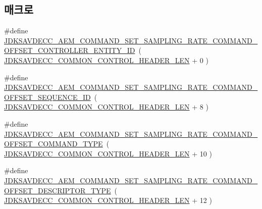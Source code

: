 \subsection*{매크로}
\begin{DoxyCompactItemize}
\item 
\#define \hyperlink{group__command__set__sampling__rate_gac21e08aedf5431e401f87a4b1363950b}{J\+D\+K\+S\+A\+V\+D\+E\+C\+C\+\_\+\+A\+E\+M\+\_\+\+C\+O\+M\+M\+A\+N\+D\+\_\+\+S\+E\+T\+\_\+\+S\+A\+M\+P\+L\+I\+N\+G\+\_\+\+R\+A\+T\+E\+\_\+\+C\+O\+M\+M\+A\+N\+D\+\_\+\+O\+F\+F\+S\+E\+T\+\_\+\+C\+O\+N\+T\+R\+O\+L\+L\+E\+R\+\_\+\+E\+N\+T\+I\+T\+Y\+\_\+\+ID}~( \hyperlink{group__jdksavdecc__avtp__common__control__header_gaae84052886fb1bb42f3bc5f85b741dff}{J\+D\+K\+S\+A\+V\+D\+E\+C\+C\+\_\+\+C\+O\+M\+M\+O\+N\+\_\+\+C\+O\+N\+T\+R\+O\+L\+\_\+\+H\+E\+A\+D\+E\+R\+\_\+\+L\+EN} + 0 )
\item 
\#define \hyperlink{group__command__set__sampling__rate_gadf81ffa091c6d1514f8b6dc77e7be349}{J\+D\+K\+S\+A\+V\+D\+E\+C\+C\+\_\+\+A\+E\+M\+\_\+\+C\+O\+M\+M\+A\+N\+D\+\_\+\+S\+E\+T\+\_\+\+S\+A\+M\+P\+L\+I\+N\+G\+\_\+\+R\+A\+T\+E\+\_\+\+C\+O\+M\+M\+A\+N\+D\+\_\+\+O\+F\+F\+S\+E\+T\+\_\+\+S\+E\+Q\+U\+E\+N\+C\+E\+\_\+\+ID}~( \hyperlink{group__jdksavdecc__avtp__common__control__header_gaae84052886fb1bb42f3bc5f85b741dff}{J\+D\+K\+S\+A\+V\+D\+E\+C\+C\+\_\+\+C\+O\+M\+M\+O\+N\+\_\+\+C\+O\+N\+T\+R\+O\+L\+\_\+\+H\+E\+A\+D\+E\+R\+\_\+\+L\+EN} + 8 )
\item 
\#define \hyperlink{group__command__set__sampling__rate_ga756768be87d051d781ba3c793983b22c}{J\+D\+K\+S\+A\+V\+D\+E\+C\+C\+\_\+\+A\+E\+M\+\_\+\+C\+O\+M\+M\+A\+N\+D\+\_\+\+S\+E\+T\+\_\+\+S\+A\+M\+P\+L\+I\+N\+G\+\_\+\+R\+A\+T\+E\+\_\+\+C\+O\+M\+M\+A\+N\+D\+\_\+\+O\+F\+F\+S\+E\+T\+\_\+\+C\+O\+M\+M\+A\+N\+D\+\_\+\+T\+Y\+PE}~( \hyperlink{group__jdksavdecc__avtp__common__control__header_gaae84052886fb1bb42f3bc5f85b741dff}{J\+D\+K\+S\+A\+V\+D\+E\+C\+C\+\_\+\+C\+O\+M\+M\+O\+N\+\_\+\+C\+O\+N\+T\+R\+O\+L\+\_\+\+H\+E\+A\+D\+E\+R\+\_\+\+L\+EN} + 10 )
\item 
\#define \hyperlink{group__command__set__sampling__rate_gabcd1b26cb4dd9ca2c4f0dfaa7c8aba35}{J\+D\+K\+S\+A\+V\+D\+E\+C\+C\+\_\+\+A\+E\+M\+\_\+\+C\+O\+M\+M\+A\+N\+D\+\_\+\+S\+E\+T\+\_\+\+S\+A\+M\+P\+L\+I\+N\+G\+\_\+\+R\+A\+T\+E\+\_\+\+C\+O\+M\+M\+A\+N\+D\+\_\+\+O\+F\+F\+S\+E\+T\+\_\+\+D\+E\+S\+C\+R\+I\+P\+T\+O\+R\+\_\+\+T\+Y\+PE}~( \hyperlink{group__jdksavdecc__avtp__common__control__header_gaae84052886fb1bb42f3bc5f85b741dff}{J\+D\+K\+S\+A\+V\+D\+E\+C\+C\+\_\+\+C\+O\+M\+M\+O\+N\+\_\+\+C\+O\+N\+T\+R\+O\+L\+\_\+\+H\+E\+A\+D\+E\+R\+\_\+\+L\+EN} + 12 )

\end{DoxyCompactItemize}
